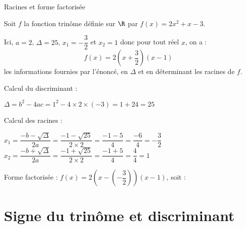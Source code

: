 \begin{EXO}{Racines et forme factorisée}{}
\begin{MultiColonnes}{3}
    \tcbitem[raster multicolumn=2] Soit $f$ la fonction trinôme définie sur $\R$ par $f(x)=2x^2+x-3$.

\noindent Ici, $a=2$, $\Delta=25$, $x_1=-\dfrac{3}{2}$ et $x_2=1$ donc pour tout réel $x$, on a : $$f(x)=2\left(x+\dfrac{3}{2}\right)(x-1)$$
    \tcbitem {} les informations fournies par l'énoncé, en  $\Delta$ et en déterminant les racines de $f$. 
\end{MultiColonnes}

\exocorrection

\begin{tcbenumerate}
\tcbitem Calcul du discriminant :

$\Delta = b^2 - 4ac = 1^2 - 4 \times 2 \times (-3) = 1 + 24 = 25$

\tcbitem Calcul des racines :

\begin{MultiColonnes}{2}
\tcbitem $x_1 = \dfrac{-b-\sqrt{\Delta}}{2a} = \dfrac{-1-\sqrt{25}}{2\times 2} = \dfrac{-1-5}{4} = \dfrac{-6}{4} = -\dfrac{3}{2}$
\tcbitem $x_2 = \dfrac{-b+\sqrt{\Delta}}{2a} = \dfrac{-1+\sqrt{25}}{2\times 2} = \dfrac{-1+5}{4} = \dfrac{4}{4} = 1$
\end{MultiColonnes}

\tcbitem Forme factorisée : $f(x) = 2\left(x-\left(-\dfrac{3}{2}\right)\right)(x-1)$, soit :
\begin{center}\end{center}

\end{tcbenumerate}

\end{EXO}

\newpage
\section{Signe du trinôme et discriminant}

